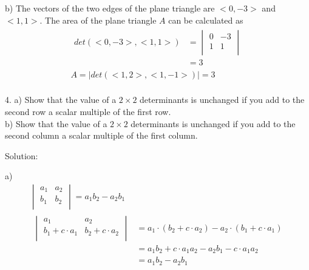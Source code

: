 \documentclass{article}
\begin{document}
b) The vectors of the two edges of the plane triangle are $<0, -3>$ and 
$<1, 1>$. The area of the plane triangle $A$ can be calculated as
\begin{gather*}
  \begin{split}
    det(<0, -3>, <1, 1>) &= \begin{vmatrix}
                              0 & -3 \\
                              1 & 1 \\ 
                            \end{vmatrix} \\
                         &= 3
  \end{split} \\
  A = |det(<1, 2>, <1, -1>)| = 3 \\
\end{gather*}

4. a) Show that the value of a $2 \times 2$ determinants is unchanged if you add
to the second row a scalar multiple of the first row.\\
   b) Show that the value of a $2 \times 2$ determinants is unchanged if you add
to the second column a scalar multiple of the first column.

Solution:

a)
\begin{gather*}
  \begin{vmatrix}
    a_1 & a_2 \\
    b_1 & b_2 \\
  \end{vmatrix} = a_1b_2 - a_2b_1 \\
  \begin{split}
    \begin{vmatrix}
      a_1 & a_2 \\
      b_1 + c \cdot a_1 & b_2 + c \cdot a_2 \\
    \end{vmatrix} &= 
    a_1 \cdot (b_2 + c \cdot a_2) - a_2 \cdot (b_1 + c \cdot a_1) \\
    &= a_1b_2 + c \cdot a_1a_2 - a_2b_1 - c \cdot a_1a_2 \\
    &= a_1b_2 - a_2b_1 \\
  \end{split} \\
\end{gather*}
\end{document}

